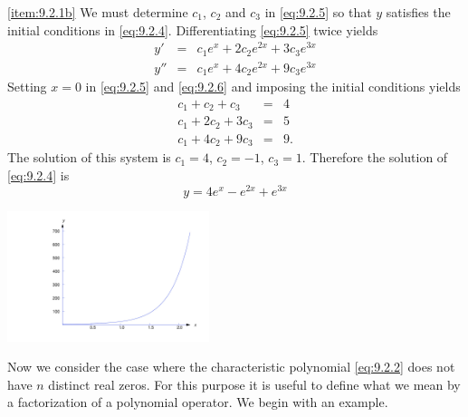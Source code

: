 \documentclass{ximera}
\begin{document}
\begin{example}
\begin{explanation}
\ref{item:9.2.1b} We must determine $c_1$, $c_2$ and $c_3$ in
\eqref{eq:9.2.5}
so that $y$ satisfies the initial conditions in \eqref{eq:9.2.4}.
Differentiating \eqref{eq:9.2.5} twice yields
\begin{equation} \label{eq:9.2.6}
\begin{array}{rcl}
y'&=&c_1e^{x}+2c_2e^{2x}+3c_3e^{3x}\\
y''&=&c_1e^{x}+4c_2e^{2x}+9c_3e^{3x}
\end{array}
\end{equation}
Setting $x=0$ in \eqref{eq:9.2.5} and \eqref{eq:9.2.6}  and imposing the
initial conditions yields
$$\begin{array}{rcl}
c_1+c_2+c_3&=&4\\
c_1+2c_2+3c_3&=&5\\
c_1+4c_2+9c_3&=&9.
\end{array}$$
The solution of this system is $c_1=4$, $c_2=-1$, $c_3=1$. Therefore the
solution of \eqref{eq:9.2.4} is
 $$
y=4e^x-e^{2x}+e^{3x}
$$
\begin{image}
 \includegraphics[height=1.5in]{fig090201.jpg} 
\end{image}


\end{explanation}
\end{example}

Now we consider the case where the characteristic polynomial
\eqref{eq:9.2.2} does not have $n$ distinct real zeros. For this purpose
it is useful to define what we mean by a factorization of a polynomial
operator. We begin with an example.
\end{document}
